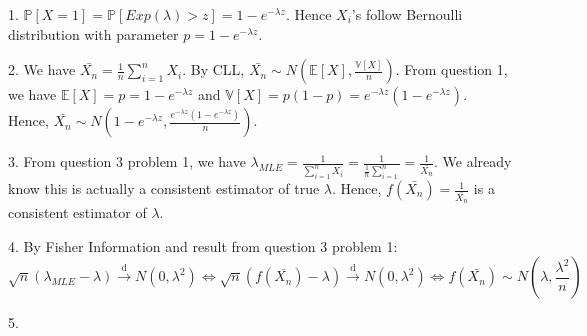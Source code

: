\documentclass[10pt]{article}
\newenvironment{problem}[2][Problem]{\begin{trivlist}
\item[\hskip \labelsep {\bfseries #1}\hskip \labelsep {\bfseries #2.}]}{\end{trivlist}}
\begin{document}
\begin{problem}{3}
\item 1. $\mathbb{P}[X=1]=\mathbb{P}[Exp(\lambda) > z]= 1- e^{-\lambda z} $. Hence $X_{i}$'s follow Bernoulli distribution with parameter $p=1- e^{-\lambda z}$.
\item 2. We have $\bar{X_n}=\frac{1}{n}\sum_{i=1}^{n}X_i$. By CLL, $\bar{X_n} \sim N(\mathbb{E}[X], \frac{\mathbb{V}[X]}{n})$. From question 1, we have $\mathbb{E}[X]=p=1- e^{-\lambda z}$ and $\mathbb{V}[X]=p(1-p)=e^{-\lambda z}(1- e^{-\lambda z})$. Hence, $\bar{X_n} \sim N(1- e^{-\lambda z}, \frac{e^{-\lambda z}(1- e^{-\lambda z})}{n} )$.
\item 3. From question 3 problem 1, we have $\lambda_{MLE}=\frac{1}{\sum_{i=1}^{n}X_i}=\frac{1}{\frac{1}{n}\sum_{i=1}^{n}}=\frac{1}{\bar{X_n}}$. We already know this is actually a consistent  estimator of true $\lambda$. Hence, $f(\bar{X_n})=\frac{1}{\bar{X_n}}$ is a consistent estimator of $\lambda$.\\


\item 4. By Fisher Information and result from question 3 problem 1: 
\[ \sqrt{n}(\lambda_{MLE} - \lambda) \xrightarrow{\text{d}} N(0, \lambda^2) \Leftrightarrow \sqrt{n}(f(\bar{X_n}) - \lambda) \xrightarrow{\text{d}} N(0, \lambda^2) \Leftrightarrow f(\bar{X_n}) \sim N(\lambda, \frac{\lambda^2}{n}) \]

\item 5.  

\end{problem}
\end{document}
